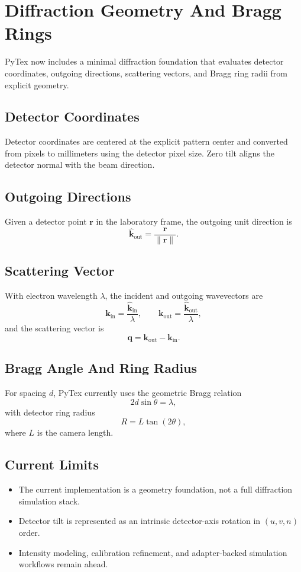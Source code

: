 \section{Diffraction Geometry And Bragg Rings}

PyTex now includes a minimal diffraction foundation that evaluates detector coordinates, outgoing directions, scattering vectors, and Bragg ring radii from explicit geometry.

\subsection{Detector Coordinates}

Detector coordinates are centered at the explicit pattern center and converted from pixels to millimeters using the detector pixel size. Zero tilt aligns the detector normal with the beam direction.

\subsection{Outgoing Directions}

Given a detector point $\mathbf{r}$ in the laboratory frame, the outgoing unit direction is
\[
  \hat{\mathbf{k}}_{\mathrm{out}} = \frac{\mathbf{r}}{\lVert \mathbf{r} \rVert}.
\]

\subsection{Scattering Vector}

With electron wavelength $\lambda$, the incident and outgoing wavevectors are
\[
  \mathbf{k}_{\mathrm{in}} = \frac{\hat{\mathbf{k}}_{\mathrm{in}}}{\lambda},
  \qquad
  \mathbf{k}_{\mathrm{out}} = \frac{\hat{\mathbf{k}}_{\mathrm{out}}}{\lambda},
\]
and the scattering vector is
\[
  \mathbf{q} = \mathbf{k}_{\mathrm{out}} - \mathbf{k}_{\mathrm{in}}.
\]

\subsection{Bragg Angle And Ring Radius}

For spacing $d$, PyTex currently uses the geometric Bragg relation
\[
  2 d \sin \theta = \lambda,
\]
with detector ring radius
\[
  R = L \tan(2\theta),
\]
where $L$ is the camera length.

\subsection{Current Limits}

\begin{itemize}
  \item The current implementation is a geometry foundation, not a full diffraction simulation stack.
  \item Detector tilt is represented as an intrinsic detector-axis rotation in $(u,v,n)$ order.
  \item Intensity modeling, calibration refinement, and adapter-backed simulation workflows remain ahead.
\end{itemize}
